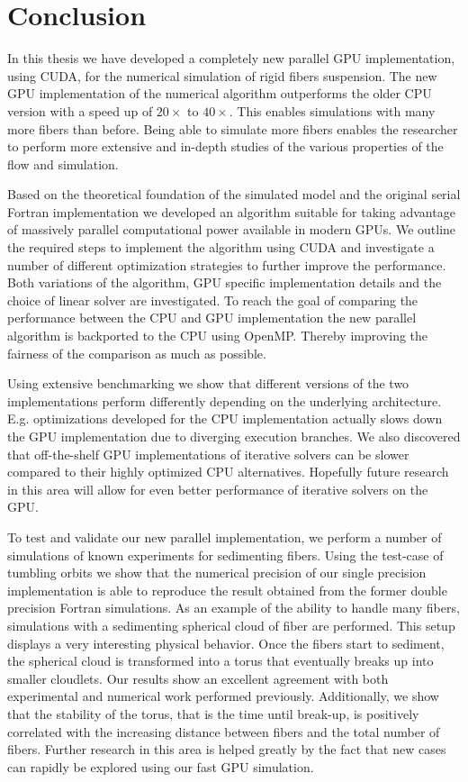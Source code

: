 \chapter{Conclusion}

In this thesis we have developed a completely new parallel GPU implementation, using CUDA, for the numerical simulation of rigid fibers suspension. The new GPU implementation of the numerical algorithm outperforms the older CPU version with a speed up of $20×$ to $40×$. This enables simulations with many more fibers than before. Being able to simulate more fibers enables the researcher to perform more extensive and in-depth studies of the various properties of the flow and simulation.

Based on the theoretical foundation of the simulated model and the original serial Fortran implementation we developed an algorithm suitable for taking advantage of massively parallel computational power available in modern GPUs. We outline the required steps to implement the algorithm using CUDA and investigate a number of different optimization strategies to further improve the performance. Both variations of the algorithm, GPU specific implementation details and the choice of linear solver are investigated. To reach the goal of comparing the performance between the CPU and GPU implementation the new parallel algorithm is backported to the CPU using OpenMP. Thereby improving the fairness of the comparison as much as possible.

Using extensive benchmarking we show that different versions of the two implementations perform differently depending on the underlying architecture. E.g. optimizations developed for the CPU implementation actually slows down the GPU implementation due to diverging execution branches. We also discovered that off-the-shelf GPU implementations of iterative solvers can be slower compared to their highly optimized CPU alternatives. Hopefully future research in this area will allow for even better performance of iterative solvers on the GPU.

To test and validate our new parallel implementation, we perform a number of simulations of known experiments for sedimenting fibers. Using the test-case of tumbling orbits we show that the numerical precision of our single precision implementation is able to reproduce the result obtained from the former double precision Fortran simulations. As an example of the ability to handle many fibers, simulations with a sedimenting spherical cloud of fiber are performed. This setup displays a very interesting physical behavior. Once the fibers start to sediment, the spherical cloud is transformed into a torus that eventually breaks up into smaller cloudlets. Our results show an excellent agreement with both experimental and numerical work performed previously. Additionally, we show that the stability of the torus, that is the time until break-up, is positively correlated with the increasing distance between fibers and the total number of fibers. Further research in this area is helped greatly by the fact that new cases can rapidly be explored using our fast GPU simulation.

